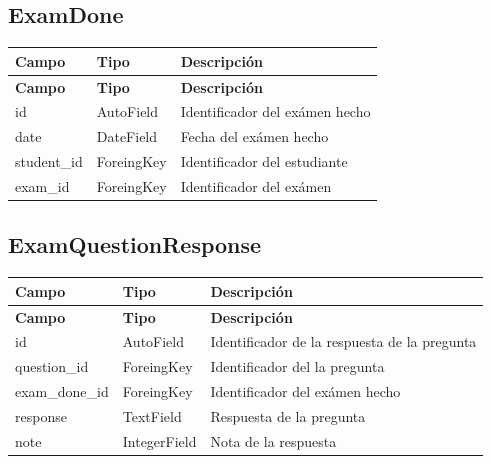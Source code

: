 \documentclass[a4paper,12pt]{article}
\begin{document}
\subsection{ExamDone}
\begin{longtable}{| p{3cm} | p{3cm}|p{10cm}|}
	\hline
	\textbf{Campo} & \textbf{Tipo} & \textbf{Descripción} \\
	\hline
	\endfirsthead
	\hline
	\textbf{Campo} & \textbf{Tipo} & \textbf{Descripción} \\
	\hline
	\endhead
	\hline
	\endfoot
	\hline
	\endlastfoot
	
	id & AutoField & Identificador del exámen hecho \\
	\hline
	date & DateField & Fecha del exámen hecho \\
	\hline
	student\_id & ForeingKey & Identificador del estudiante\\
	\hline
	exam\_id & ForeingKey & Identificador del exámen\\
	\hline
\end{longtable}


\subsection{ExamQuestionResponse}
\begin{longtable}{| p{3cm} | p{3cm}|p{10cm}|}
	\hline
	\textbf{Campo} & \textbf{Tipo} & \textbf{Descripción} \\
	\hline
	\endfirsthead
	\hline
	\textbf{Campo} & \textbf{Tipo} & \textbf{Descripción} \\
	\hline
	\endhead
	\hline
	\endfoot
	\hline
	\endlastfoot
	
	id & AutoField & Identificador de la respuesta de la pregunta  \\
	\hline
	question\_id & ForeingKey & Identificador del la pregunta\\
	\hline
	exam\_done\_id & ForeingKey & Identificador del exámen hecho \\
	\hline
	response & TextField & Respuesta de la pregunta  \\
	\hline
	note & IntegerField & Nota de la respuesta \\
	
	\hline
\end{longtable}
\end{document}
